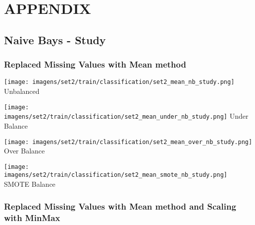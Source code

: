 \documentclass[11pt]{article}
\begin{document}

\newpage

\section*{APPENDIX}

\subsection*{Naive Bays - Study}

\subsubsection*{Replaced Missing Values with Mean method}

\begin{figure*}[!htp]
    \begin{minipage}[!htp]{.25\textwidth}
        \centering
        \texttt{[image: imagens/set2/train/classification/set2\_mean\_nb\_study.png]}
        Unbalanced
    \end{minipage}\hfill
    \begin{minipage}[!htp]{.25\textwidth}
        \centering
        \texttt{[image: imagens/set2/train/classification/set2\_mean\_under\_nb\_study.png]}
        Under Balance
    \end{minipage}\hfill
    \begin{minipage}[!htp]{.25\textwidth}
        \centering
        \texttt{[image: imagens/set2/train/classification/set2\_mean\_over\_nb\_study.png]}
        Over Balance
    \end{minipage}\hfill
    \begin{minipage}[!htp]{.25\textwidth}
        \centering
        \texttt{[image: imagens/set2/train/classification/set2\_mean\_smote\_nb\_study.png]}
        SMOTE Balance
    \end{minipage}
\end{figure*}

\subsubsection*{Replaced Missing Values with Mean method and Scaling with MinMax}
\end{document}
